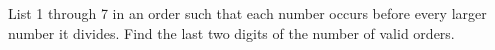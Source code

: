 List 1 through 7 in an order such that each number occurs before every larger number it divides. Find the last two digits of the number of valid orders.
